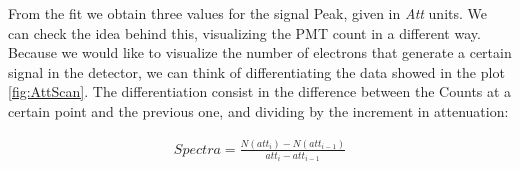 \begin{figure}[hbtp]
\centering
{}
\end{figure}

From the fit we obtain three values for the signal Peak, given in \textit{Att} units. We can check the idea behind this, visualizing the PMT count in a different way. Because we would like to visualize the number of electrons that generate a certain signal in the detector, we can think of differentiating the data showed in the plot \ref{fig:AttScan}. The differentiation consist in the difference between the Counts at a certain point and the previous one, and dividing by the increment in attenuation:

\begin{align*}
Spectra = \frac{N(att_{i}) - N(att_{i-1})}{att_{i} - att_{i-1}} 
\end{align*}

